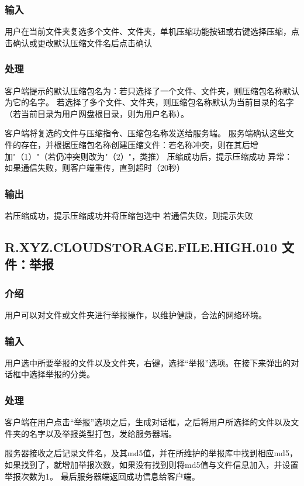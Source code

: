 \subsubsection{输入} 
用户在当前文件夹复选多个文件、文件夹，单机压缩功能按钮或右键选择压缩，点击确认或更改默认压缩文件名后点击确认

\subsubsection{处理} 
客户端提示的默认压缩包名为：若只选择了一个文件、文件夹，则压缩包名称默认为它的名字。
若选择了多个文件、文件夹，则压缩包名称默认为当前目录的名字（若当前目录为用户网盘根目录，则为用户名称）。

客户端将复选的文件与压缩指令、压缩包名称发送给服务端。
服务端确认这些文件的存在，并根据压缩包名称创建压缩文件：若名称冲突，则在其后增加"（1）"（若仍冲突则改为"（2）"，类推）
压缩成功后，提示压缩成功
异常：如果通信失败，则客户端重传，直到超时（20秒）

\subsubsection{输出} 
若压缩成功，提示压缩成功并将压缩包选中
若通信失败，则提示失败


\subsection{R.XYZ.CLOUDSTORAGE.FILE.HIGH.010 文件：举报}

\subsubsection{介绍}
用户可以对文件或文件夹进行举报操作，以维护健康，合法的网络环境。

\subsubsection{输入} 
用户选中所要举报的文件以及文件夹，右键，选择“举报”选项。在接下来弹出的对话框中选择举报的分类。

\subsubsection{处理} 
客户端在用户点击“举报”选项之后，生成对话框，之后将用户所选择的文件以及文件夹的名字以及举报类型打包，发给服务器端。

服务器接收之后记录文件名，及其md5值，并在所维护的举报库中找到相应md5，如果找到了，就增加举报次数，如果没有找到则将md5值与文件信息加入，并设置举报次数为1。
最后服务器端返回成功信息给客户端。

